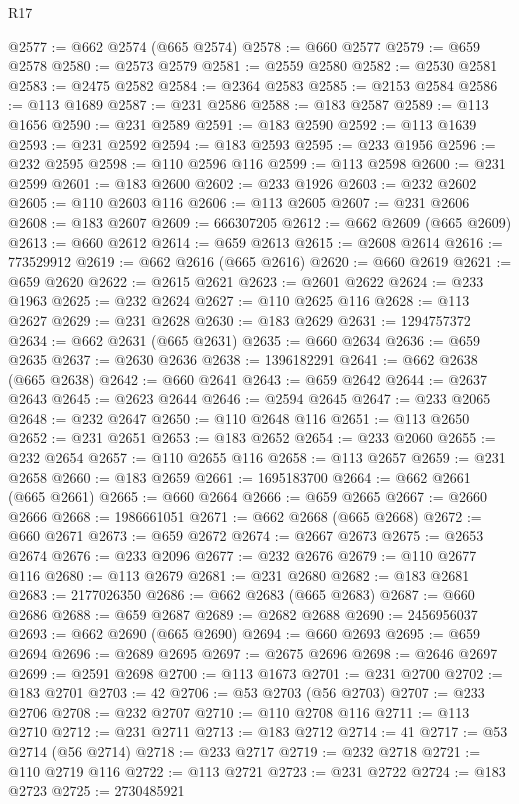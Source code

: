 \begin{lexlean}{R17}
\begin{coremodule}
{{{{{{{{{{{{{{{{{{{{{{{{{{{{{{{{{{{{{{{{{{{{{{{{{{{{{{{{{{{{{{{{{{{{{{{{{{{{{{{{{{{{{@2577 := @662 @2574 (@665 @2574)
@2578 := @660 @2577
@2579 := @659 @2578
@2580 := @2573 @2579
@2581 := @2559 @2580
@2582 := @2530 @2581
@2583 := @2475 @2582
@2584 := @2364 @2583
@2585 := @2153 @2584
@2586 := @113 @1689
@2587 := @231 @2586
@2588 := @183 @2587
@2589 := @113 @1656
@2590 := @231 @2589
@2591 := @183 @2590
@2592 := @113 @1639
@2593 := @231 @2592
@2594 := @183 @2593
@2595 := @233 @1956
@2596 := @232 @2595
@2598 := @110 @2596 @116
@2599 := @113 @2598
@2600 := @231 @2599
@2601 := @183 @2600
@2602 := @233 @1926
@2603 := @232 @2602
@2605 := @110 @2603 @116
@2606 := @113 @2605
@2607 := @231 @2606
@2608 := @183 @2607
@2609 := 666307205
@2612 := @662 @2609 (@665 @2609)
@2613 := @660 @2612
@2614 := @659 @2613
@2615 := @2608 @2614
@2616 := 773529912
@2619 := @662 @2616 (@665 @2616)
@2620 := @660 @2619
@2621 := @659 @2620
@2622 := @2615 @2621
@2623 := @2601 @2622
@2624 := @233 @1963
@2625 := @232 @2624
@2627 := @110 @2625 @116
@2628 := @113 @2627
@2629 := @231 @2628
@2630 := @183 @2629
@2631 := 1294757372
@2634 := @662 @2631 (@665 @2631)
@2635 := @660 @2634
@2636 := @659 @2635
@2637 := @2630 @2636
@2638 := 1396182291
@2641 := @662 @2638 (@665 @2638)
@2642 := @660 @2641
@2643 := @659 @2642
@2644 := @2637 @2643
@2645 := @2623 @2644
@2646 := @2594 @2645
@2647 := @233 @2065
@2648 := @232 @2647
@2650 := @110 @2648 @116
@2651 := @113 @2650
@2652 := @231 @2651
@2653 := @183 @2652
@2654 := @233 @2060
@2655 := @232 @2654
@2657 := @110 @2655 @116
@2658 := @113 @2657
@2659 := @231 @2658
@2660 := @183 @2659
@2661 := 1695183700
@2664 := @662 @2661 (@665 @2661)
@2665 := @660 @2664
@2666 := @659 @2665
@2667 := @2660 @2666
@2668 := 1986661051
@2671 := @662 @2668 (@665 @2668)
@2672 := @660 @2671
@2673 := @659 @2672
@2674 := @2667 @2673
@2675 := @2653 @2674
@2676 := @233 @2096
@2677 := @232 @2676
@2679 := @110 @2677 @116
@2680 := @113 @2679
@2681 := @231 @2680
@2682 := @183 @2681
@2683 := 2177026350
@2686 := @662 @2683 (@665 @2683)
@2687 := @660 @2686
@2688 := @659 @2687
@2689 := @2682 @2688
@2690 := 2456956037
@2693 := @662 @2690 (@665 @2690)
@2694 := @660 @2693
@2695 := @659 @2694
@2696 := @2689 @2695
@2697 := @2675 @2696
@2698 := @2646 @2697
@2699 := @2591 @2698
@2700 := @113 @1673
@2701 := @231 @2700
@2702 := @183 @2701
@2703 := 42
@2706 := @53 @2703 (@56 @2703)
@2707 := @233 @2706
@2708 := @232 @2707
@2710 := @110 @2708 @116
@2711 := @113 @2710
@2712 := @231 @2711
@2713 := @183 @2712
@2714 := 41
@2717 := @53 @2714 (@56 @2714)
@2718 := @233 @2717
@2719 := @232 @2718
@2721 := @110 @2719 @116
@2722 := @113 @2721
@2723 := @231 @2722
@2724 := @183 @2723
@2725 := 2730485921
}}}}}}}}}}}}}}}}}}}}}}}}}}}}}}}}}}}}}}}}}}}}}}}}}}}}}}}}}}}}}}}}}}}}}}}}}}}}}}}}}}}}}
\end{coremodule}
\end{lexlean}
